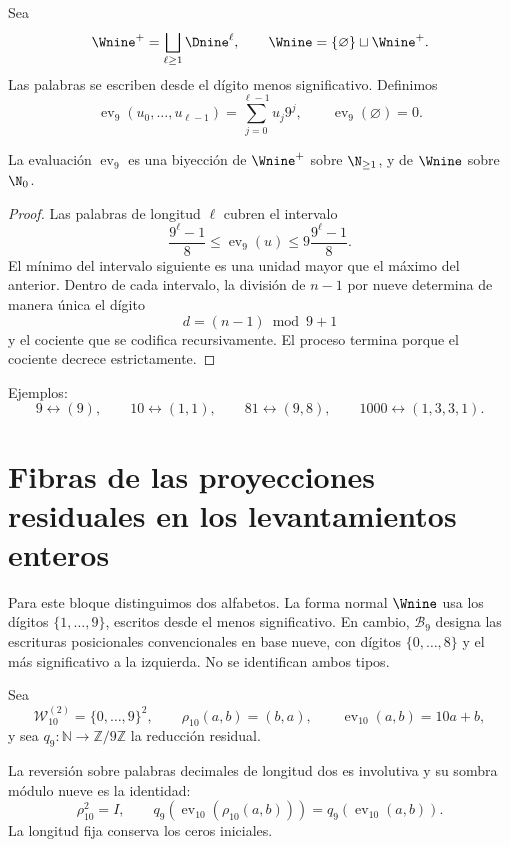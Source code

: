 \begin{definition}
Sea
\[
 \Wnine^+=\bigsqcup_{\ell\geq1}\Dnine^\ell,
 \qquad \Wnine=\{\varnothing\}\sqcup\Wnine^+.
\]
Las palabras se escriben desde el dígito menos significativo. Definimos
\[
 \operatorname{ev}_9(u_0,\ldots,u_{\ell-1})
 =\sum_{j=0}^{\ell-1}u_j9^j,
 \qquad \operatorname{ev}_9(\varnothing)=0.
\]
\end{definition}

\begin{theorem}
La evaluación $\operatorname{ev}_9$ es una biyección de $\Wnine^+$ sobre
$\N_{\geq1}$, y de $\Wnine$ sobre $\N_0$.
\end{theorem}

\begin{proof}
Las palabras de longitud $\ell$ cubren el intervalo
\[
 \frac{9^\ell-1}{8}
 \leq \operatorname{ev}_9(u)
 \leq 9\frac{9^\ell-1}{8}.
\]
El mínimo del intervalo siguiente es una unidad mayor que el máximo del
anterior. Dentro de cada intervalo, la división de $n-1$ por nueve determina
de manera única el dígito
\[
 d=(n-1)\bmod9+1
\]
y el cociente que se codifica recursivamente. El proceso termina porque el
cociente decrece estrictamente.
\end{proof}

Ejemplos:
\[
 9\longleftrightarrow(9),\qquad
 10\longleftrightarrow(1,1),\qquad
 81\longleftrightarrow(9,8),\qquad
 1000\longleftrightarrow(1,3,3,1).
\]

\section{Fibras de las proyecciones residuales en los levantamientos enteros}

Para este bloque distinguimos dos alfabetos. La forma normal
\(\Wnine\) usa los dígitos \(\{1,\ldots,9\}\), escritos desde el menos
significativo. En cambio, \(\mathscr B_9\) designa las escrituras posicionales
convencionales en base nueve, con dígitos \(\{0,\ldots,8\}\) y el más
significativo a la izquierda. No se identifican ambos tipos.

Sea
\[
 \mathscr W_{10}^{(2)}=\{0,\ldots,9\}^2,\qquad
 \rho_{10}(a,b)=(b,a),\qquad
 \operatorname{ev}_{10}(a,b)=10a+b,
\]
y sea \(q_9:\mathbb N\to\mathbb Z/9\mathbb Z\) la reducción residual.

\begin{lemma}
\label{int:pf84:SYN30-RHO-DESC}
La reversión sobre palabras decimales de longitud dos es involutiva y su
sombra módulo nueve es la identidad:
\[
 \rho_{10}^2=I,\qquad
 q_9\!\left(\operatorname{ev}_{10}(\rho_{10}(a,b))\right)
 =
 q_9\!\left(\operatorname{ev}_{10}(a,b)\right).
\]
La longitud fija conserva los ceros iniciales.
\end{lemma}

